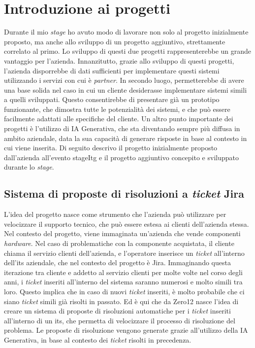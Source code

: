 \section{Introduzione ai progetti}
Durante il mio \textit{stage} ho avuto modo di lavorare non solo al progetto inizialmente proposto, ma anche allo sviluppo di un progetto aggiuntivo, strettamente correlato al primo.
Lo sviluppo di questi due progetti rappresenterebbe un grande vantaggio per l'azienda. Innanzitutto, grazie allo sviluppo di questi progetti, l'azienda disporrebbe di dati sufficienti per implementare questi sistemi utilizzando i servizi con cui è \textit{partner}. In secondo luogo, permetterebbe di avere una base solida nel 
caso in cui un cliente desiderasse implementare sistemi simili a quelli sviluppati. Questo consentirebbe di presentare già un prototipo funzionante, che dimostra tutte le potenzialità dei sistemi, e che può essere facilmente adattati alle specifiche del cliente.
Un altro punto importante dei progetti è l'utilizzo di IA Generativa, che sta diventando sempre più diffusa in ambito aziendale, data la sua capacità di generare risposte in base al contesto in cui viene inserita.
Di seguito descrivo il progetto inizialmente proposto dall'azienda all'evento \gls{stageItg} e il progetto aggiuntivo concepito e sviluppato durante lo \textit{stage}.
\subsection{Sistema di proposte di risoluzioni a \textit{ticket} Jira} \label{sec:spiegazioneJira}
L'idea del progetto nasce come strumento che l'azienda può utilizzare per velocizzare il supporto tecnico, che può essere estesa ai clienti dell'azienda stessa. Nel contesto del progetto, viene immaginata un'azienda che vende componenti \textit{hardware}. 
Nel caso di problematiche con la componente acquistata, il cliente chiama il servizio clienti dell'azienda, e l'operatore inserisce un \textit{ticket} all'interno dell'\gls{its} aziendale, che nel contesto del progetto è Jira. Immaginando questa iterazione tra cliente e addetto al servizio clienti per molte volte nel corso degli anni, i \textit{ticket} inseriti all'interno del sistema saranno numerosi e molto simili tra loro. 
Questo implica che in caso di nuovi \textit{ticket} inseriti, è molto probabile che ci siano \textit{ticket} simili già risolti in passato. 
Ed è qui che da Zero12 nasce l'idea di creare un sistema di proposte di risoluzioni automatiche per i \textit{ticket} inseriti all'interno di un \gls{its}, che permetta di velocizzare il processo di risoluzione del problema. Le proposte di risoluzione vengono generate grazie all'utilizzo della IA Generativa, in base al contesto dei \textit{ticket} risolti in precedenza.

